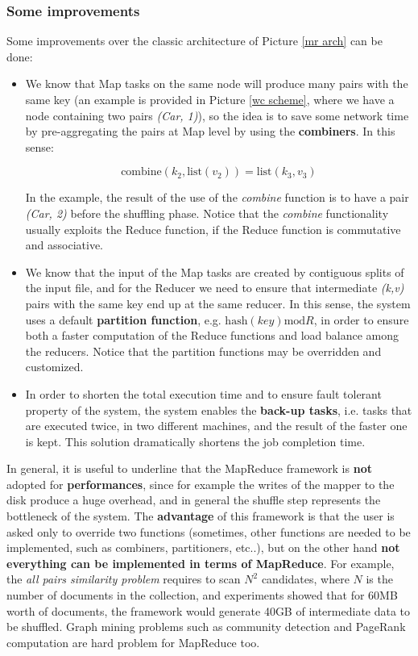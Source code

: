 \subsubsection{Some improvements}
Some improvements over the classic architecture of Picture \ref{mr arch} can be done:

\begin{itemize}
    \item We know that Map tasks on the same node will produce many pairs with the same key (an example is provided in Picture \ref{wc scheme}, where we have a node containing two pairs \textit{(Car, 1)}), so the idea is to save some network time by pre-aggregating the pairs at Map level by using the \textbf{combiners}. In this sense:

    $$
    \text{combine}(k_2, \text{list}(v_2)) = \text{list}(k_3, v_3)
    $$

    In the example, the result of the use of the \textit{combine} function is to have a pair \textit{(Car, 2)} before the shuffling phase. Notice that the \textit{combine} functionality usually exploits the Reduce function, if the Reduce function is commutative and associative.

    \item We know that the input of the Map tasks are created by contiguous splits of the input file, and for the Reducer we need to ensure that intermediate \textit{(k,v)} pairs with the same key end up at the same reducer. In this sense, the system uses a default \textbf{partition function}, e.g. $\text{hash}(key) \text{mod} R$, in order to ensure both a faster computation of the Reduce functions and load balance among the reducers. Notice that the partition functions may be overridden and customized.

    \item In order to shorten the total execution time and to ensure fault tolerant property of the system, the system enables the \textbf{back-up tasks}, i.e. tasks that are executed twice, in two different machines, and the result of the faster one is kept. This solution dramatically shortens the job completion time.
    
\end{itemize}

In general, it is useful to underline that the MapReduce framework is \textbf{not} adopted for \textbf{performances}, since for example the writes of the mapper to the disk produce a huge overhead, and in general the shuffle step represents the bottleneck of the system. The \textbf{advantage} of this framework is that the user is asked only to override two functions (sometimes, other functions are needed to be implemented, such as combiners, partitioners, etc..), but on the other hand \textbf{not everything can be implemented in terms of MapReduce}. For example, the \textit{all pairs similarity problem} requires to scan $N^2$ candidates, where $N$ is the number of documents in the collection, and experiments showed that for 60MB worth of documents, the framework would generate 40GB of intermediate data to be shuffled. Graph mining problems such as community detection and PageRank computation are hard problem for MapReduce too.

